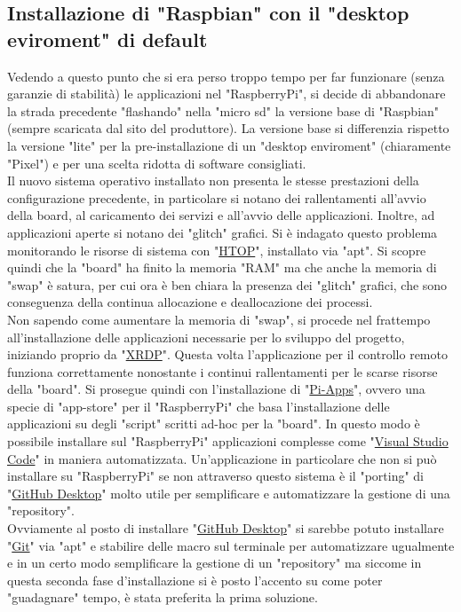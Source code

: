 \subsection{Installazione di "Raspbian" con il "desktop eviroment" di default}
\raggedright
Vedendo a questo punto che si era perso troppo tempo per far funzionare (senza garanzie di stabilità) le applicazioni nel "RaspberryPi", si decide di abbandonare la strada precedente "flashando" nella "micro sd" la versione base di "Raspbian" (sempre scaricata dal sito del produttore). La versione base si differenzia rispetto la versione "lite" per la pre-installazione di un "desktop enviroment" (chiaramente "Pixel") e per una scelta ridotta di software consigliati.\\
Il nuovo sistema operativo installato non presenta le stesse prestazioni della configurazione precedente, in particolare si notano dei rallentamenti all'avvio della board, al caricamento dei servizi e all'avvio delle applicazioni. Inoltre, ad applicazioni aperte si notano dei "glitch" grafici. Si è indagato questo problema monitorando le risorse di sistema con "\href{https://htop.dev/}{HTOP}", installato via "apt". Si scopre quindi che la "board" ha finito la memoria "RAM" ma che anche la memoria di "swap" è satura, per cui ora è ben chiara la presenza dei "glitch" grafici, che sono conseguenza della continua allocazione e deallocazione dei processi.\\
Non sapendo come aumentare la memoria di "swap", si procede nel frattempo all'installazione delle applicazioni necessarie per lo sviluppo del progetto, iniziando proprio da "\href{https://github.com/neutrinolabs/xrdp}{XRDP}". Questa volta l'applicazione per il controllo remoto funziona correttamente nonostante i continui rallentamenti per le scarse risorse della "board". Si prosegue quindi con l'installazione di "\href{https://pi-apps.io/}{Pi-Apps}", ovvero una specie di "app-store" per il "RaspberryPi" che basa l'installazione delle applicazioni su degli "script" scritti ad-hoc per la "board". In questo modo è possibile installare sul "RaspberryPi" applicazioni complesse come "\href{https://code.visualstudio.com/}{Visual Studio Code}" in maniera automatizzata. Un'applicazione in particolare che non si può installare su "RaspberryPi" se non attraverso questo sistema è il "porting" di "\href{https://desktop.github.com/}{GitHub Desktop}" molto utile per semplificare e automatizzare la gestione di una "repository".\\
Ovviamente al posto di installare "\href{https://desktop.github.com/}{GitHub Desktop}" si sarebbe potuto installare "\href{https://git-scm.com/}{Git}" via "apt" e stabilire delle macro sul terminale per automatizzare ugualmente e in un certo modo semplificare la gestione di un "repository" ma siccome in questa seconda fase d'installazione si è posto l'accento su come poter "guadagnare" tempo, è stata preferita la prima soluzione.\\
